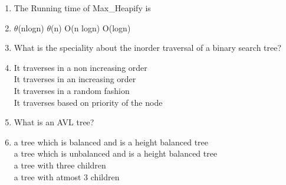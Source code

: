 \documentclass[12pt ,a4paper]{exam}
\begin{document}
	\begin{enumerate}[start=1,label={\bfseries Q\arabic*)}]
		\itemsep0.2em
		
		\item The Running time of Max\_Heapify is
		\item[] 
		\begin{oneparchoices}
			\choice $\theta$(nlogn)  %
			\choice $\theta$(n) 
			\choice O(n logn) 
			\choice O(logn)   \checkmark 
		\end{oneparchoices}
		
	  \item What is the speciality about the inorder traversal of a binary search tree?
	  \item[] 
	  \begin{oneparchoices}
	  	\choice It traverses in a non increasing order\\ %
	  	\choice It traverses in an increasing order  \checkmark \\
	  	\choice It traverses in a random fashion\\
	  	\choice It traverses based on priority of the node
	  \end{oneparchoices}
	
	 \item What is an AVL tree?
	 \item[] 
	 \begin{oneparchoices}
	 	\choice a tree which is balanced and is a height balanced tree   \checkmark \\ %
	 	\choice a tree which is unbalanced and is a height balanced tree \\
	 	\choice a tree with three children \\
	 	\choice a tree with atmost 3 children
	 \end{oneparchoices}
	

\end{enumerate}
\end{document}
